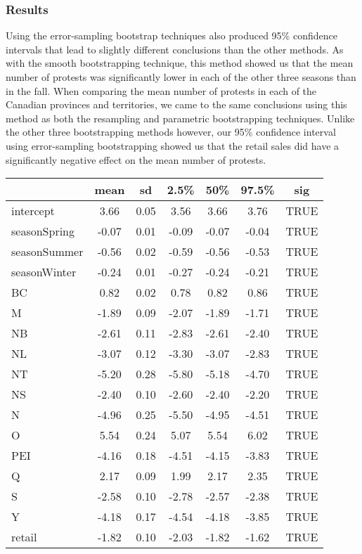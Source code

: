 \documentclass[12pt]{article}
\begin{document}
\subsubsection*{Results}
Using the error-sampling bootstrap techniques also produced 95\% confidence intervals that lead to slightly different conclusions than the other methods. As with the smooth bootstrapping technique, this method showed us that the mean number of protests was significantly lower in each of the other three seasons than in the fall.
When comparing the mean number of protests in each of the Canadian provinces and territories, we came to the same conclusions using this method as both the resampling and parametric bootstrapping techniques.
Unlike the other three bootstrapping methods however, our 95\% confidence interval using error-sampling bootstrapping showed us that the retail sales did have a significantly negative effect on the mean number of protests.
\begin{table}[hbt!]
  \centering
  \begin{tabular}{|l|c|c|c|c|c|c|}
    \hline
                 & mean  & sd   & 2.5\% & 50\%  & 97.5\% & sig  \\
    \hline
    intercept    & 3.66  & 0.05 & 3.56  & 3.66  & 3.76   & TRUE \\
    seasonSpring & -0.07 & 0.01 & -0.09 & -0.07 & -0.04  & TRUE \\
    seasonSummer & -0.56 & 0.02 & -0.59 & -0.56 & -0.53  & TRUE \\
    seasonWinter & -0.24 & 0.01 & -0.27 & -0.24 & -0.21  & TRUE \\
    BC           & 0.82  & 0.02 & 0.78  & 0.82  & 0.86   & TRUE \\
    M            & -1.89 & 0.09 & -2.07 & -1.89 & -1.71  & TRUE \\
    NB           & -2.61 & 0.11 & -2.83 & -2.61 & -2.40  & TRUE \\
    NL           & -3.07 & 0.12 & -3.30 & -3.07 & -2.83  & TRUE \\
    NT           & -5.20 & 0.28 & -5.80 & -5.18 & -4.70  & TRUE \\
    NS           & -2.40 & 0.10 & -2.60 & -2.40 & -2.20  & TRUE \\
    N            & -4.96 & 0.25 & -5.50 & -4.95 & -4.51  & TRUE \\
    O            & 5.54  & 0.24 & 5.07  & 5.54  & 6.02   & TRUE \\
    PEI          & -4.16 & 0.18 & -4.51 & -4.15 & -3.83  & TRUE \\
    Q            & 2.17  & 0.09 & 1.99  & 2.17  & 2.35   & TRUE \\
    S            & -2.58 & 0.10 & -2.78 & -2.57 & -2.38  & TRUE \\
    Y            & -4.18 & 0.17 & -4.54 & -4.18 & -3.85  & TRUE \\
    retail       & -1.82 & 0.10 & -2.03 & -1.82 & -1.62  & TRUE \\
    \hline
  \end{tabular}
\end{table}
\end{document}
